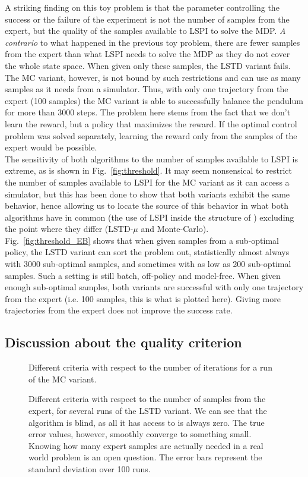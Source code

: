 \documentclass{jfpda2011}
\begin{document}
A striking finding on this toy problem is that the parameter controlling the success or the failure of the experiment is not the number of samples from the expert, but the quality of the samples available to LSPI to solve the MDP. \emph{A contrario} to what happened in the previous toy problem, there are fewer samples from the expert than what LSPI needs to solve the MDP as they do not cover the whole state space. When given only these samples, the LSTD variant fails. The MC variant, however, is not bound by such restrictions and can use as many samples as it needs from a simulator. Thus, with only one trajectory from the expert (100 samples) the MC variant is able to successfully balance the pendulum for more than 3000 steps. The problem here stems from the fact that we don't learn the reward, but a policy that maximizes the reward. If the optimal control problem was solved separately, learning the reward only from the samples of the expert would be possible.\\

The sensitivity of both algorithms to the number of samples available to LSPI is extreme, as is shown in Fig.~\ref{fig:threshold}. It may seem nonsensical to restrict the number of samples available to LSPI for the MC variant as it can access a simulator, but this has been done to show that both variants exhibit the same behavior, hence allowing us to locate the source of this behavior in what both algorithms have in common (the use of LSPI inside the structure of \citep{abbeel2004apprenticeship}) excluding the point where they differ (LSTD-$\mu$ and Monte-Carlo).\\

Fig.~\ref{fig:threshold_EB} shows that when given samples from a sub-optimal policy, the LSTD variant can sort the problem out, statistically almost always with 3000 sub-optimal samples, and sometimes with as low as 200 sub-optimal samples. Such a setting is still batch, off-policy and model-free. When given enough sub-optimal samples, both variants are successful with only one trajectory from the expert (i.e. 100 samples, this is what is plotted here). Giving more trajectories from the expert does not improve the success rate.
\subsection{Discussion about the quality criterion}
\label{ssec:quality}
\begin{figure}
\centering

\caption{Different criteria with respect to the number of iterations for a run of the MC variant.}
\label{fig:A}
\end{figure}
\begin{figure}
\centering

\caption{Different criteria with respect to the number of samples from the expert, for several runs of the LSTD variant. We can see that the algorithm is blind, as all it has access to is always zero. The true error values, however, smoothly converge to something small. Knowing how many expert samples are actually needed in a real world problem is an open question. The error bars represent the standard deviation over 100 runs.}
\label{fig:B}
\end{figure}
\end{document}
